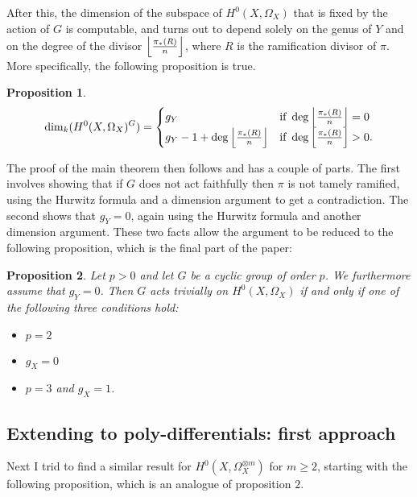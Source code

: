 \documentclass[11pt]{article} %
\newtheorem{prop}{Proposition}
\begin{document}
After this, the dimension of the subspace of $H^0(X,\Omega_X)$ that is fixed by the action of $G$ is computable, 
and turns out to depend  solely on the genus of $Y$ and on the degree of the divisor 
$\Big{\lfloor}\frac{\pi_*(R)}{n}\Big{\rfloor}$, where $R$ is the ramification divisor of $\pi$. More specifically, 
the following proposition is true.\\


\begin{prop}
\begin{equation*}
			\dim_k(H^0(X,\Omega_{X})^G)  =
				\begin{cases}
					g_Y & \mbox{if }\deg\Big{\lfloor}\frac{\pi_*(R)}{n}\Big{\rfloor}=0\\
					g_Y-1+\deg\Big{\lfloor}\frac{\pi_*(R)}{n}\Big{\rfloor} & \mbox{if } \deg\Big{\lfloor}\frac{\pi_*(R)}{n}\Big{\rfloor}>0.
				\end{cases}
		\end{equation*}
\end{prop}

The proof of the main theorem then follows and has a couple of parts. 
The first involves showing that if $G$ does not act faithfully then $\pi$ is not tamely ramified, using the Hurwitz formula 
and a dimension argument to get a contradiction. The second shows that $g_Y=0$, again using the Hurwitz formula and 
another dimension argument. These two facts allow the argument to be reduced to the following proposition, which is the 
final part of the paper:\\

\begin{prop}
	Let $p>0$ and let $G$ be a cyclic group of order $p$. We furthermore assume that $g_Y=0$. Then $G$ 
	acts trivially on $H^0(X,\Omega_X)$ if and only if one of the following three conditions hold: 
		\begin{itemize}
			\item $p=2$
			\item $g_X=0$
			\item $p=3$ and $g_X=1$.
		\end{itemize}
\end{prop}

\subsection{Extending to poly-differentials: first approach}
Next I trid to find a similar result for $H^0(X,\Omega_X^{\otimes m})$ for $m\geq 2$, 
starting with the following proposition, which is an analogue of proposition $2$.\\
\end{document}
